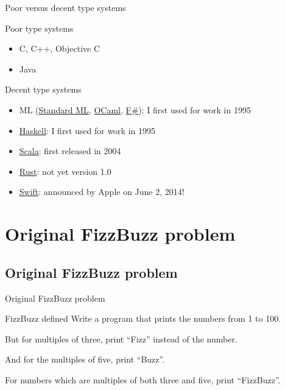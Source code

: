\begin{frame}{Poor versus decent type systems}
  \begin{block}{Poor type systems}
    \begin{itemize}
    \item C, C++, Objective C
    \item Java
    \end{itemize}
  \end{block}

  \begin{block}{Decent type systems}
    \begin{itemize}
    \item ML (\href{http://www.smlnj.org/}{Standard ML}, \href{http://ocaml.org/}{OCaml}, \href{http://fsharp.org/}{F\#}): I first used for work in 1995
    \item \href{http://www.haskell.org/}{Haskell}: I first used for work in 1995
    \item \href{http://www.scala-lang.org/}{Scala}: first released in 2004
    \item \href{http://www.rust-lang.org/}{Rust}: not yet version 1.0
    \item \href{http://developer.apple.com/swift/}{Swift}: announced by Apple on June 2, 2014!
    \end{itemize}
  \end{block}
\end{frame}

\section{Original FizzBuzz problem}

\subsection{Original FizzBuzz problem}

\begin{frame}{Original FizzBuzz problem}
  \begin{block}{FizzBuzz defined}
    Write a program that prints the numbers from 1 to 100.

    But for multiples of three, print ``Fizz'' instead of the number.

    And for the multiples of five, print ``Buzz''.

    For numbers which are multiples of both three and five, print ``FizzBuzz''.
  \end{block}
\end{frame}

